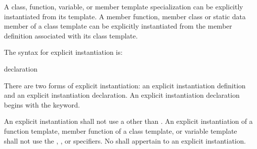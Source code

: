 \pnum
{}%
%
A class, function, variable, or member template specialization can be explicitly
instantiated from its template.
A member function, member class or static data member of a class template can
be explicitly instantiated from the member definition associated with its class
template.

\pnum
The syntax for explicit instantiation is:

\begin{bnf}
\br
    declaration
\end{bnf}

There are two forms of explicit instantiation: an explicit instantiation
definition and an explicit instantiation declaration. An explicit instantiation
declaration begins with the  keyword.

\pnum
An explicit instantiation shall not use
a 
other than .
An explicit instantiation of a
function template,
member function of a class template, or
variable template
shall not
use the , , or  specifiers.
No 
shall appertain to an explicit instantiation.

